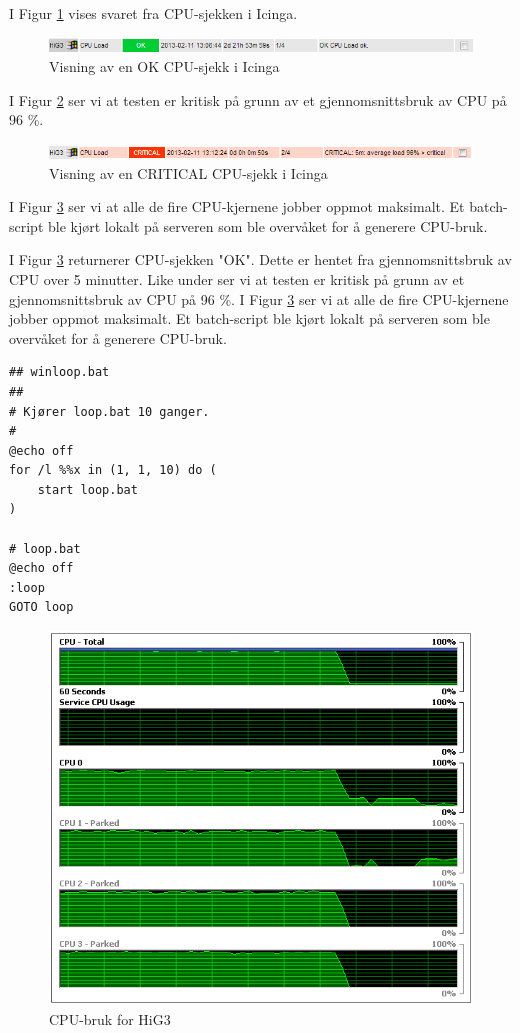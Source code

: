 I Figur \ref{cpuok} vises svaret fra CPU-sjekken i Icinga. 
\begin{figure}[H]
    \centering
    \includegraphics[scale=0.8]{img/HiG3_cpu_ok}
    \caption{Visning av en OK CPU-sjekk i Icinga}
    \label{cpuok}
\end{figure}

I Figur \ref{cpucritical} ser vi at testen er kritisk på grunn av et gjennomsnittsbruk av CPU på 96 \%. 
\begin{figure}[H]
    \centering
    \includegraphics[scale=0.8]{img/HiG3_cpu_critical}
    \caption{Visning av en CRITICAL CPU-sjekk i Icinga}
    \label{cpucritical}
\end{figure}

I Figur \ref{cpustrain} ser vi at alle de fire CPU-kjernene jobber oppmot maksimalt. Et batch-script ble kjørt lokalt på serveren som ble overvåket for å generere CPU-bruk.

I Figur \ref{cpustrain} returnerer CPU-sjekken "OK". Dette er hentet fra gjennomsnittsbruk av CPU over 5 minutter. Like under ser vi at testen er kritisk på grunn av et gjennomsnittsbruk av CPU på 96 \%. I Figur \ref{cpustrain} ser vi at alle de fire CPU-kjernene jobber oppmot maksimalt. Et batch-script ble kjørt lokalt på serveren som ble overvåket for å generere CPU-bruk.
\begin{lstlisting}[style=example]
## winloop.bat
##
# Kjører loop.bat 10 ganger.
#
@echo off
for /l %%x in (1, 1, 10) do (
    start loop.bat
)

# loop.bat
@echo off
:loop
GOTO loop
\end{lstlisting}

\begin{figure}[H]
    \centering
    \includegraphics[scale=0.6]{img/HiG3_cpu_graph}
    \caption{CPU-bruk for HiG3}
    \label{cpustrain}
\end{figure}

